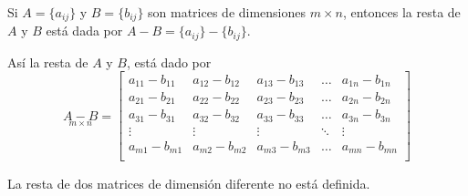 \begin{definition}
Si $A = \{a_{ij}\}$ y $B = \{b_{ij}\}$ son matrices de dimensiones $m\times n$, entonces la resta de $A$ y $B$ está dada por $A-B=\{a_{ij}\}-\{b_{ij}\}$.
\end{definition}
Así la resta de $A$ y $B$, está dado  por
$$
\underset{m \times n}{A-B}=\begin{bmatrix}
    a_{11}-b_{11} & a_{12}-b_{12} & a_{13}-b_{13} & \dots & a_{1n}-b_{1n} \\
    a_{21}-b_{21} & a_{22}-b_{22} & a_{23}-b_{23} & \dots & a_{2n}-b_{2n} \\
    a_{31}-b_{31} & a_{32}-b_{32} & a_{33}-b_{33} & \dots & a_{3n}-b_{3n} \\
    \vdots & \vdots & \vdots & \ddots & \vdots \\
    a_{m1}-b_{m1} & a_{m2}-b_{m2} & a_{m3}-b_{m3} & \dots & a_{mn}-b_{mn} \\
  \end{bmatrix}
$$



\begin{remark}
La resta de dos matrices de dimensión diferente no está definida.    
\end{remark}
